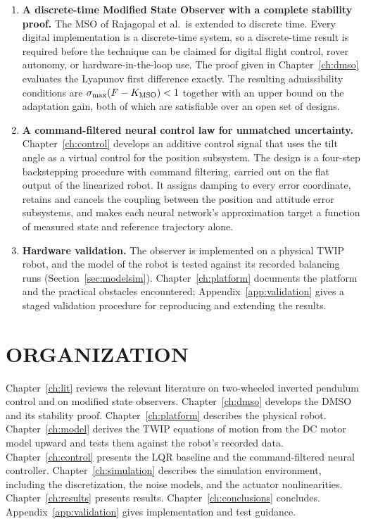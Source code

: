 \begin{enumerate}[label=(\roman*),leftmargin=*]

\item \textbf{A discrete-time Modified State Observer with a complete stability
proof.} The MSO of Rajagopal et al.\ is extended to discrete time. Every digital
implementation is a discrete-time system, so a discrete-time result is required
before the technique can be claimed for digital flight control, rover autonomy,
or hardware-in-the-loop use. The proof given in Chapter~\ref{ch:dmso} evaluates
the Lyapunov first difference exactly. The resulting admissibility conditions
are $\sigma_{\max}(F-K_{\mathrm{MSO}})<1$ together with an upper bound on the adaptation gain, both
of which are satisfiable over an open set of designs.

\item \textbf{A command-filtered neural control law for unmatched uncertainty.}
Chapter~\ref{ch:control} develops an additive control signal that uses the tilt
angle as a virtual control for the position subsystem. The design is a
four-step backstepping procedure with command filtering, carried out on the
flat output of the linearized robot. It assigns damping to every error
coordinate, retains and cancels the coupling between the position and attitude
error subsystems, and makes each neural network's approximation target a
function of measured state and reference trajectory alone.

\item \textbf{Hardware validation.} The observer is implemented on a physical
TWIP robot, and the model of the robot is tested against its recorded balancing
runs (Section~\ref{sec:modelsim}). Chapter~\ref{ch:platform} documents the
platform and the practical obstacles encountered; Appendix~\ref{app:validation}
gives a staged validation procedure for reproducing and extending the results.

\end{enumerate}

\section{ORGANIZATION}

Chapter~\ref{ch:lit} reviews the relevant literature on two-wheeled inverted
pendulum control and on modified state observers. Chapter~\ref{ch:dmso} develops
the DMSO and its stability proof. Chapter~\ref{ch:platform} describes the
physical robot. Chapter~\ref{ch:model} derives the TWIP equations of motion from
the DC motor model upward and tests them against the robot's recorded data.
Chapter~\ref{ch:control} presents the LQR baseline and the command-filtered
neural controller. Chapter~\ref{ch:simulation} describes the simulation
environment, including the discretization, the noise models, and the actuator
nonlinearities. Chapter~\ref{ch:results} presents results.
Chapter~\ref{ch:conclusions} concludes. Appendix~\ref{app:validation} gives
implementation and test guidance.
